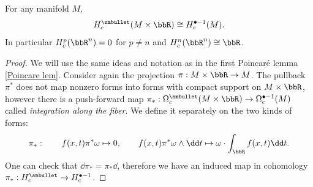 \begin{thm}
    For any manifold $M$, 
    \[H_c^{\smbullet }(M\times \bbR)\cong H_c^{\bullet-1}(M).\] 
    In particular $H_c^p(\bbR^n)=0$ for $p\neq n$ and $H_c^n(\bbR^n)\cong\bbR$.
\end{thm}
\begin{proof}
    We will use the same ideas and notation as in the first Poincar\'e lemma \ref{Poincare lem}. Consider again the projection $\pi:M\times \bbR\to M$. The pullback $\pi^\ast$ does not map nonzero forms into forms with compact support on $M\times\bbR$, however there is a push-forward map $\pi_\ast:\Omega_c^{\smbullet }(M\times\bbR)\to \Omega_c^{\bullet-1}(M)$ called \emph{integration along the fiber}. We define it separately on the two kinds of forms:
    \begin{equation}
        \pi_\ast: \quad\quad f(x,t)\pi^\ast\omega\mapsto  0,\quad\quad f(x,t)\pi^\ast \omega \wedge \dd t\mapsto  \omega\cdot\int_\bbR f(x,t)\dd t. 
    \end{equation}
    One can check that $\dd\pi_\ast=\pi_\ast \dd$, therefore we have an induced map in cohomology $\pi_\ast:H_c^{\smbullet }\to H_c^{\bullet-1}$.
    

\end{proof}
